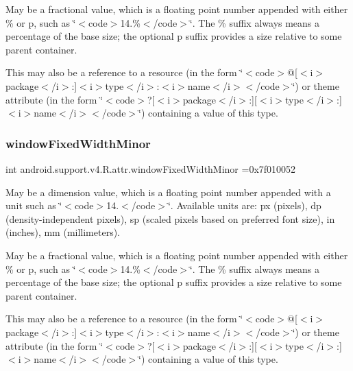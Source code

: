 May be a fractional value, which is a floating point number appended with either \% or p, such as \char`\"{}$<$code$>$14.\%$<$/code$>$\char`\"{}. The \% suffix always means a percentage of the base size; the optional p suffix provides a size relative to some parent container. 

This may also be a reference to a resource (in the form \char`\"{}$<$code$>$@\mbox{[}$<$i$>$package$<$/i$>$\+:\mbox{]}$<$i$>$type$<$/i$>$\+:$<$i$>$name$<$/i$>$$<$/code$>$\char`\"{}) or theme attribute (in the form \char`\"{}$<$code$>$?\mbox{[}$<$i$>$package$<$/i$>$\+:\mbox{]}\mbox{[}$<$i$>$type$<$/i$>$\+:\mbox{]}$<$i$>$name$<$/i$>$$<$/code$>$\char`\"{}) containing a value of this type. \mbox{\label{classandroid_1_1support_1_1v4_1_1R_1_1attr_af403718d44d96e714cbf73376eff3f80}} 
\subsubsection{\texorpdfstring{window\+Fixed\+Width\+Minor}{windowFixedWidthMinor}}
{\footnotesize\ttfamily int android.\+support.\+v4.\+R.\+attr.\+window\+Fixed\+Width\+Minor =0x7f010052\hspace{0.3cm}{\ttfamily [static]}}

May be a dimension value, which is a floating point number appended with a unit such as \char`\"{}$<$code$>$14.\+5sp$<$/code$>$\char`\"{}. Available units are\+: px (pixels), dp (density-\/independent pixels), sp (scaled pixels based on preferred font size), in (inches), mm (millimeters). 

May be a fractional value, which is a floating point number appended with either \% or p, such as \char`\"{}$<$code$>$14.\%$<$/code$>$\char`\"{}. The \% suffix always means a percentage of the base size; the optional p suffix provides a size relative to some parent container. 

This may also be a reference to a resource (in the form \char`\"{}$<$code$>$@\mbox{[}$<$i$>$package$<$/i$>$\+:\mbox{]}$<$i$>$type$<$/i$>$\+:$<$i$>$name$<$/i$>$$<$/code$>$\char`\"{}) or theme attribute (in the form \char`\"{}$<$code$>$?\mbox{[}$<$i$>$package$<$/i$>$\+:\mbox{]}\mbox{[}$<$i$>$type$<$/i$>$\+:\mbox{]}$<$i$>$name$<$/i$>$$<$/code$>$\char`\"{}) containing a value of this type. \mbox{\label{classandroid_1_1support_1_1v4_1_1R_1_1attr_a331daac6525b467fa201e2659110760e}} 
